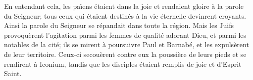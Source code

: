 En entendant cela, les païens étaient dans la joie
	et rendaient gloire à la parole du Seigneur;
	tous ceux qui étaient destinés à la vie éternelle devinrent croyants.
Ainsi la parole du Seigneur se répandait dans toute la région.
Mais les Juifs provoquèrent l’agitation parmi les femmes de qualité adorant Dieu,
	et parmi les notables de la cité;
	ils se mirent à poursuivre Paul et Barnabé, et les expulsèrent de leur territoire.
Ceux-ci secouèrent contre eux la poussière de leurs pieds et se rendirent à Iconium,
	tandis que les disciples étaient remplis de joie et d’Esprit Saint.
